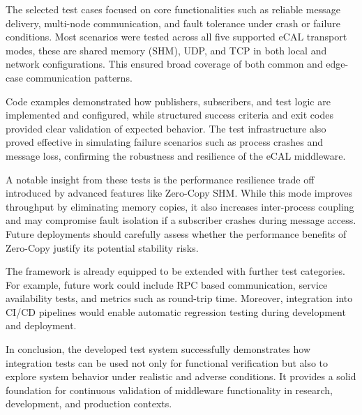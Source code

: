 \vspace{1em}
The selected test cases focused on core functionalities such as reliable message delivery, multi-node communication, and fault tolerance under crash or failure conditions. Most scenarios were tested across all five supported eCAL transport modes, these are shared memory (SHM), UDP, and TCP in both local and network configurations. This ensured broad coverage of both common and edge-case communication patterns.

\vspace{1em}
Code examples demonstrated how publishers, subscribers, and test logic are implemented and configured, while structured success criteria and exit codes provided clear validation of expected behavior. The test infrastructure also proved effective in simulating failure scenarios such as process crashes and message loss, confirming the robustness and resilience of the eCAL middleware.

\vspace{1em}
A notable insight from these tests is the performance resilience trade off introduced by advanced features like Zero-Copy SHM. While this mode improves throughput by eliminating memory copies, it also increases inter-process coupling and may compromise fault isolation if a subscriber crashes during message access. Future deployments should carefully assess whether the performance benefits of Zero-Copy justify its potential stability risks.

\vspace{1em}
The framework is already equipped to be extended with further test categories. For example, future work could include RPC based communication, service availability tests, and metrics such as round-trip time. Moreover, integration into CI/CD pipelines would enable automatic regression testing during development and deployment.

\vspace{1em}
In conclusion, the developed test system successfully demonstrates how integration tests can be used not only for functional verification but also to explore system behavior under realistic and adverse conditions. It provides a solid foundation for continuous validation of middleware functionality in research, development, and production contexts.



